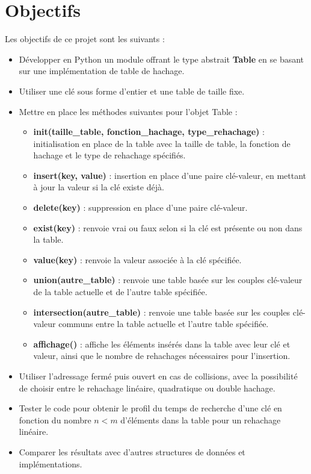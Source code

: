 \documentclass[12pt]{article}
\begin{document}
    \section{Objectifs}\label{sec:Objectifs}

    Les objectifs de ce projet sont les suivants :
    \begin{itemize}
        \item Développer en Python un module offrant le type abstrait \textbf{Table} en se basant sur une implémentation de table de hachage.
        \item Utiliser une clé sous forme d'entier et une table de taille fixe.
        \item Mettre en place les méthodes suivantes pour l'objet Table :
        \begin{itemize}
            \item \textbf{init(taille\_table, fonction\_hachage, type\_rehachage)} : initialisation en place de la table avec la taille de table, la fonction de hachage et le type de rehachage spécifiés.
            \item \textbf{insert(key, value)} : insertion en place d'une paire clé-valeur, en mettant à jour la valeur si la clé existe déjà.
            \item \textbf{delete(key)} : suppression en place d'une paire clé-valeur.
            \item \textbf{exist(key)} : renvoie vrai ou faux selon si la clé est présente ou non dans la table.
            \item \textbf{value(key)} : renvoie la valeur associée à la clé spécifiée.
            \item \textbf{union(autre\_table)} : renvoie une table basée sur les couples clé-valeur de la table actuelle et de l'autre table spécifiée.
            \item \textbf{intersection(autre\_table)} : renvoie une table basée sur les couples clé-valeur communs entre la table actuelle et l'autre table spécifiée.
            \item \textbf{affichage()} : affiche les éléments insérés dans la table avec leur clé et valeur, ainsi que le nombre de rehachages nécessaires pour l'insertion.
        \end{itemize}
        \item Utiliser l'adressage fermé puis ouvert en cas de collisions, avec la possibilité de choisir entre le rehachage linéaire, quadratique ou double hachage.
        \item Tester le code pour obtenir le profil du temps de recherche d'une clé en fonction du nombre $n<m$ d'éléments dans la table pour un rehachage linéaire.
        \item Comparer les résultats avec d'autres structures de données et implémentations.
    \end{itemize}
\end{document}
